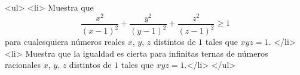 <ul>
<li> Muestra que 
\[\frac {x^{2}}{\left(x - 1\right)^{2}} + \frac {y^{2}}{\left(y - 1\right)^{2}} + \frac {z^{2}}{\left(z - 1\right)^{2}} \geq 1\]
para cualesquiera números reales $x$, $y$, $z$ distintos de $1$ tales que $xyz=1$. </li>
<li> Muestra que la igualdad es cierta para infinitas ternas de números racionales $x$, $y$, $z$ distintos de $1$ tales que $xyz=1$.</li>
</ul>


